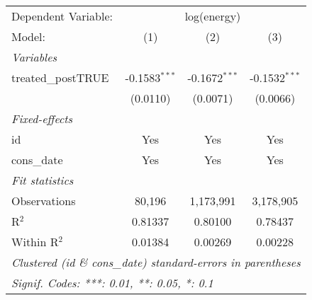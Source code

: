
\begin{tabular}{lccc}
   \tabularnewline\midrule\midrule
   Dependent Variable: & \multicolumn{3}{c}{log(energy)}\\
   Model:             & (1)             & (2)             & (3)\\
   \midrule \emph{Variables} &   &   &  \\
   treated\_postTRUE & -0.1583$^{***}$ & -0.1672$^{***}$ & -0.1532$^{***}$\\
                      & (0.0110)        & (0.0071)        & (0.0066)\\
   \midrule \emph{Fixed-effects} &   &   &  \\
   id                 & Yes             & Yes             & Yes\\
   cons\_date        & Yes             & Yes             & Yes\\
   \midrule \emph{Fit statistics} &   &   &  \\
   Observations       & 80,196          & 1,173,991       & 3,178,905\\
   R$^2$              & 0.81337         & 0.80100         & 0.78437\\
   Within R$^2$       & 0.01384         & 0.00269         & 0.00228\\
   \midrule\midrule\multicolumn{4}{l}{\emph{Clustered (id \& cons\_date) standard-errors in parentheses}}\\
   \multicolumn{4}{l}{\emph{Signif. Codes: ***: 0.01, **: 0.05, *: 0.1}}\\
\end{tabular}


